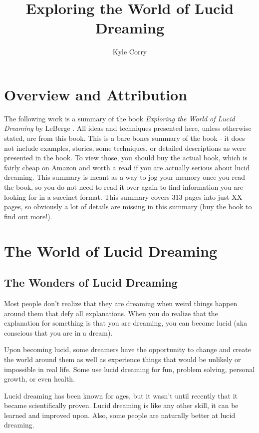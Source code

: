 \documentclass{report}
\title{Exploring the World of Lucid Dreaming}
\author{Kyle Corry}
\begin{document}
\maketitle
\setcounter{tocdepth}{1}

\tableofcontents

\chapter*{Overview and Attribution}
The following work is a summary of the book \textit{Exploring the World of Lucid Dreaming} by LeBerge \cite{leberge}. All ideas and techniques presented here, unless otherwise stated, are from this book. This is a bare bones summary of the book - it does not include examples, stories, some techniques, or detailed descriptions as were presented in the book. To view those, you should buy the actual book, which is fairly cheap on Amazon and worth a read if you are actually serious about lucid dreaming. This summary is meant as a way to jog your memory once you read the book, so you do not need to read it over again to find information you are looking for in a succinct format. This summary covers 313 pages into just XX pages, so obviously a lot of details are missing in this summary (buy the book to find out more!).

\chapter{The World of Lucid Dreaming}
\section{The Wonders of Lucid Dreaming}
Most people don't realize that they are dreaming when weird things happen around them that defy all explanations. When you do realize that the explanation for something is that you are dreaming, you can become lucid (aka conscious that you are in a dream).

Upon becoming lucid, some dreamers have the opportunity to change and create the world around them as well as experience things that would be unlikely or impossible in real life. Some use lucid dreaming for fun, problem solving, personal growth, or even health.

Lucid dreaming has been known for ages, but it wasn't until recently that it became scientifically proven. Lucid dreaming is like any other skill, it can be learned and improved upon. Also, some people are naturally better at lucid dreaming.
\end{document}
